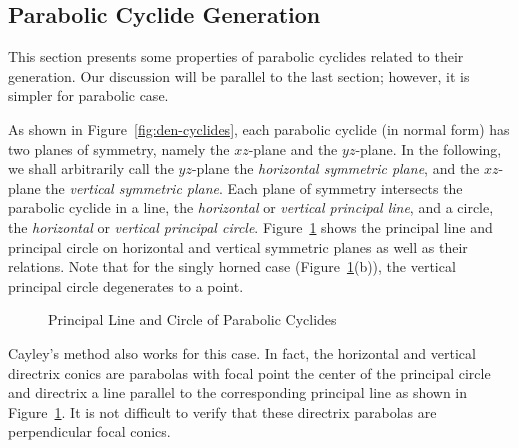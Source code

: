 
\subsection{Parabolic Cyclide Generation}
\label{section:para-cyclide-gen}

     This section presents some properties of parabolic cyclides 
related to their generation.  Our discussion will be parallel to the 
last section; however, it is simpler for parabolic case.

     As shown in Figure~\ref{fig:den-cyclides}, each parabolic cyclide 
(in normal form) has two planes of symmetry, namely the $xz$-plane and the
$yz$-plane.  In the following, we shall arbitrarily call the $yz$-plane the 
{\em horizontal symmetric plane},
 and the $xz$-plane the 
{\em vertical symmetric plane}.
Each plane of symmetry intersects the parabolic cyclide in 
a line, the {\em horizontal}
 or 
{\em vertical principal line},
 and a circle, 
the {\em horizontal}
 or 
{\em vertical principal circle}.
Figure~\ref{fig:para-line-circle} shows the principal line and principal
circle on horizontal and vertical symmetric planes as well as their relations.
Note that for the singly horned case (Figure~\ref{fig:para-line-circle}(b)), 
the vertical principal circle degenerates to a point.  
\begin{figure}
\vspace{13cm}
\caption{Principal Line and Circle of Parabolic Cyclides}
\label{fig:para-line-circle}
\end{figure}

     Cayley's method also works for this case.  In fact, the horizontal and 
vertical directrix conics are parabolas with focal point the center of the 
principal circle and directrix a line parallel to the corresponding principal 
line as shown in Figure~\ref{fig:para-line-circle}.  It is not difficult to 
verify that these directrix parabolas are perpendicular focal conics.

